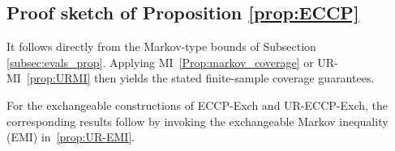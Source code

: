 \documentclass{article}
\theoremstyle{plain}
\theoremstyle{definition}
\theoremstyle{remark}
\begin{document}




\subsection{Proof sketch of Proposition \ref{prop:ECCP}}

It follows directly from the Markov-type bounds of Subsection \ref{subsec:evals_prop}. Applying MI~\eqref{Prop:markov_coverage} or UR-MI~\eqref{prop:URMI} 
then yields the stated finite-sample coverage guarantees. 

For the exchangeable constructions 
of ECCP-Exch and UR-ECCP-Exch,
the corresponding results follow by invoking the exchangeable 
Markov inequality (EMI) in~\eqref{prop:UR-EMI}.

\end{document}
